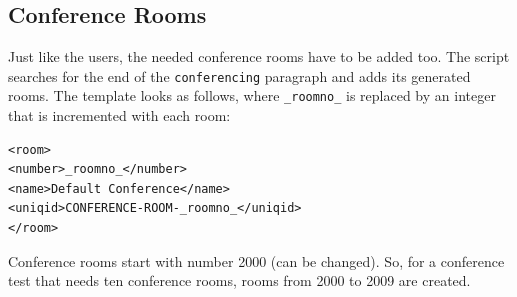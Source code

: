 \subsection{Conference Rooms}%
Just like the users, the needed conference rooms have to be added too.
The script searches for the end of the \texttt{conferencing} paragraph and adds its generated rooms.
The template looks as follows, where \texttt{\_roomno\_} is replaced by an integer that is incremented with each room:
\begin{lstlisting}[breaklines=true,label=code:config-room-template,caption={Conference room template} ]
<room>
<number>_roomno_</number>
<name>Default Conference</name>
<uniqid>CONFERENCE-ROOM-_roomno_</uniqid>
</room>
\end{lstlisting}

Conference rooms start with number 2000 (can be changed).
So, for a conference test that needs ten conference rooms, rooms from 2000 to 2009 are created.
